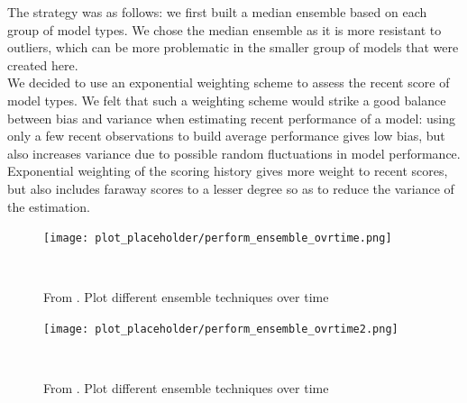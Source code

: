 The strategy was as follows: we first built a median ensemble based on each group of model types. We chose the median ensemble as it is more resistant to outliers, which can be more problematic in the smaller group of models that were created here.\\
We decided to use an exponential weighting scheme to assess the recent score of model types. We felt that such a weighting scheme would strike a good balance between bias and variance when estimating recent performance of a model: using only a few recent observations to build average performance gives low bias, but also increases variance due to possible random fluctuations in model performance. Exponential weighting of the scoring history gives more weight to recent scores, but also includes faraway scores to a lesser degree so as to reduce the variance of the estimation.\\
\begin{figure}
\centering
\texttt{[image: plot\_placeholder/perform\_ensemble\_ovrtime.png]}
\caption{From \cite{ray_ensemble_2020}. Plot different ensemble techniques over time}
\
\end{figure}
\begin{figure}
\centering
\texttt{[image: plot\_placeholder/perform\_ensemble\_ovrtime2.png]}
\caption{From \cite{ray_ensemble_2020}. Plot different ensemble techniques over time}
\
\end{figure}


